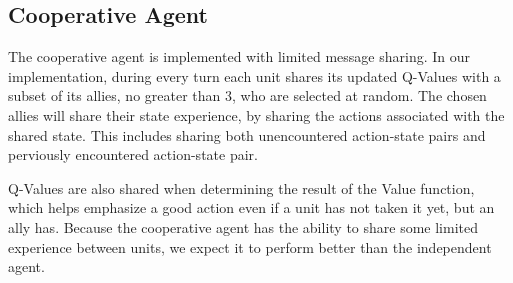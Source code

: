 \subsection{Cooperative Agent}\label{Coop_Agent}

The cooperative agent is implemented with limited message sharing. In our implementation, during every turn each unit shares its updated Q-Values with a subset of its allies, no greater than 3, who are selected at random. The chosen allies will share their state experience, by sharing the actions associated with the shared state. This includes sharing both unencountered action-state pairs and perviously encountered action-state pair.

Q-Values are also shared when determining the result of the Value function, which helps emphasize a good action even if a unit has not taken it yet, but an ally has. Because the cooperative agent has the ability to share some limited experience between units, we expect it to perform better than the independent agent.





